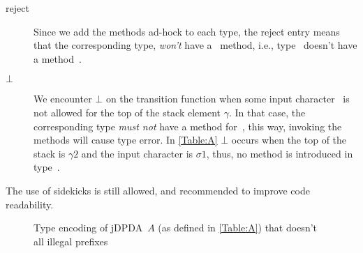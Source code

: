 \begin{description}
 \item[\textsf{reject}] Since we add the methods ad-hock to each type, the reject entry means 
   that the corresponding type, \emph{won't} have a~\cc{\$()} method, i.e., type~
   doesn't have a method~\cc{\$()}.
 \item[$\bot$] We encounter $\bot$ on the transition function when some input character~\cc{$\sigma$} 
   is not allowed for the top of the stack element $\gamma$. In that case, the corresponding type  
   \emph{must not} have a method for~\cc{$\sigma$}, this way, invoking the methods will cause type error.
   In \cref{Table:A} $\bot$ occurs when the top of the stack is $\gamma{}2$ and the input character is $\sigma{}1$,
   thus, no method  is introduced in type~.
\end{description}

The use of sidekicks is still allowed, and recommended to improve code readability.

\begin{figure}[htbp]
  \caption{\label{Figure:prefix-A}Type encoding of jDPDA~$A$ (as defined in \cref{Table:A}) 
    that doesn't all illegal prefixes}
\end{figure}